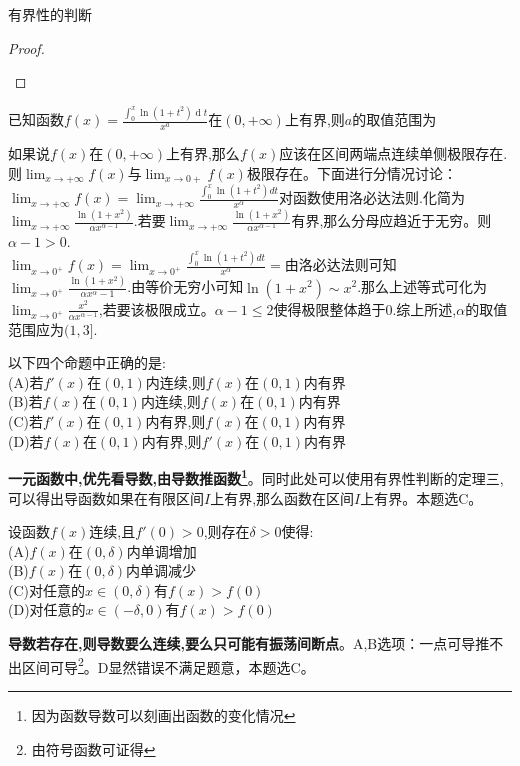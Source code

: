 \documentclass[12pt, a4paper, oneside, UTF8]{ctexbook}  %
\begin{document}
\begin{sloppypar}
\begin{criterion}{有界性的判断}{}
\begin{itemize}
\begin{proof}
\begin{itemize}
                      \end{itemize}
                  \end{proof}
        \end{itemize}
    \end{criterion}
    \begin{problem}
    已知函数$f(x)=\frac{\int_0^x\ln(1+t^2)\operatorname{d}t}{x^a}\text{在}(0,+\infty)$上有界,则$a$的取值范围为
    \end{problem}
    \begin{solution}
        如果说$f(x)$在$(0,+\infty)$上有界,那么$f(x)$应该在区间两端点连续单侧极限存在.则$\lim_{x \to +\infty}f(x)$与$\lim_{x \to 0+}f(x)$极限存在。下面进行分情况讨论：\\
        $\lim_{x \to +\infty}f(x)=\lim_{x \to +\infty}\frac{\int_0^x \ln(1+t^2)dt}{x^\alpha}$对函数使用洛必达法则.化简为$\lim_{x\to +\infty}\frac{\ln(1+x^2)}{\alpha x^{\alpha-1}}$.若要$\lim_{x\to +\infty}\frac{\ln(1+x^2)}{\alpha x^{\alpha-1}}$有界,那么分母应趋近于无穷。则$\alpha -1>0$.\\
        $\lim_{x \to 0^+}f(x)=\lim_{x \to 0^+}\frac{\int_0^x \ln(1+t^2)dt}{x^\alpha}=$由洛必达法则可知$\lim_{x \to 0^+}\frac{\ln(1+x^2)}{\alpha x ^\alpha-1}$.由等价无穷小可知$\ln(1+x^2)\sim x^2$.那么上述等式可化为$\lim_{x\to 0^+}\frac{x^2}{\alpha x^{\alpha-1}}$,若要该极限成立。$\alpha -1\leqslant2$使得极限整体趋于0.综上所述,$\alpha$的取值范围应为$(1,3]$.
    \end{solution}
    \begin{problem}
    以下四个命题中正确的是:\\
    (A)若$f'(x)$在$(0,1)$内连续,则$f(x)$在$(0,1)$内有界\\
    (B)若$f(x)$在$(0,1)$内连续,则$f(x)$在$(0,1)$内有界\\
    (C)若$f'(x)$在$(0,1)$内有界,则$f(x)$在$(0,1)$内有界\\
    (D)若$f(x)$在$(0,1)$内有界,则$f'(x)$在$(0,1)$内有界
    \end{problem}
    \begin{solution}
        \textbf{一元函数中,优先看导数,由导数推函数\footnote{因为函数导数可以刻画出函数的变化情况}}。同时此处可以使用有界性判断的定理三,可以得出导函数如果在有限区间$I$上有界,那么函数在区间$I$上有界。本题选C。
    \end{solution}
    \begin{problem}
    设函数$f(x)$连续,且$f'(0)>0$,则存在$\delta >0 $使得:\\
    (A)$f(x)$在$(0,\delta)$内单调增加\\
    (B)$f(x)$在$(0,\delta)$内单调减少\\
    (C)对任意的$x \in (0,\delta)$有$f(x)>f(0)$\\
    (D)对任意的$x\in (-\delta,0)$有$f(x)>f(0)$
    \end{problem}
    \begin{solution}
        \textbf{导数若存在,则导数要么连续,要么只可能有振荡间断点}。A,B选项：一点可导推不出区间可导\footnote{由符号函数可证得}。D显然错误不满足题意，本题选C。
    \end{solution}

\end{sloppypar}
\end{document}
